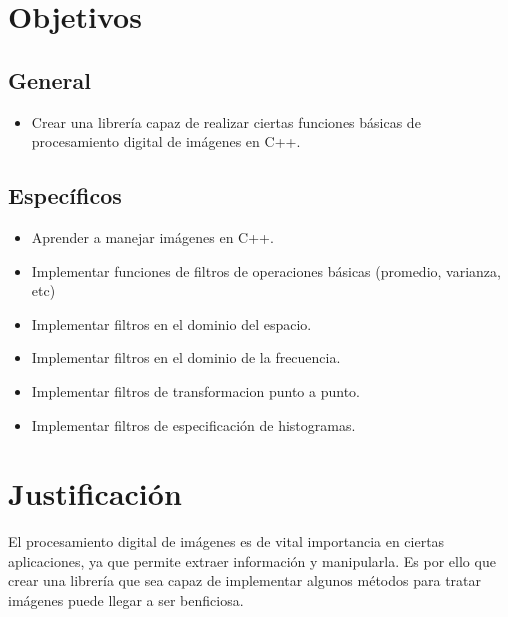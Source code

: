 \documentclass[letterpaper]{article}
\begin{document}
\section{Objetivos}

	\subsection{General}

		\begin{itemize}

		\item Crear una librería capaz de realizar ciertas funciones básicas de procesamiento digital de imágenes en C++.

		\end{itemize}

	\subsection{Específicos}

		\begin{itemize}
     
        	\item{Aprender a manejar imágenes en C++.}

			\item{Implementar funciones de filtros de operaciones básicas (promedio, varianza, etc)}

			\item{Implementar filtros en el dominio del espacio.}
            
            \item{Implementar filtros en el dominio de la frecuencia.}
            
            \item{Implementar filtros de transformacion punto a punto.}
            
            \item{Implementar filtros de especificación de histogramas.}

		\end{itemize}

\section{Justificación}

El procesamiento digital de imágenes es de vital importancia en ciertas aplicaciones, ya que permite extraer información y manipularla. Es por ello que crear una librería que sea capaz de implementar algunos métodos para tratar imágenes puede llegar a ser benficiosa.
\end{document}
